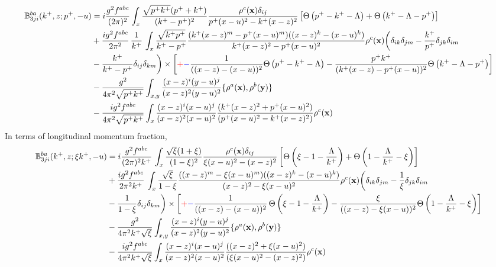 \documentclass[10pt]{article}
\def\mf#1{\mathbb{#1}}
\def\v#1{\mathbf{#1}}
\numberwithin{equation}{section}
\begin{document}
\begin{align}
   \mf{B}^{ba}_{3ji}(k^+, z;p^+, -u) & = i \frac{g^2 f^{abc}}{(2\pi)^{2}} \int_{x} %
   \frac{\sqrt{p^{+}k^{+}}(p^{+}+k^{+})} {(k^{+}-p^{+})^2} \frac{\rho^c(\v{x}) \delta_{ij}}{p^{+}(x-u)^{2} - k^{+}(x-z)^{2} }\left[\Theta\left(p^{+} - k^{+} - \Lambda \right)+\Theta\left(k^{+}-\Lambda-p^{+}\right)\right]  \notag \\ & + \frac{ig^2 f^{abc}} {2\pi^{2} } \,\frac{1}{k^{+}}\, 
   \int_{x}  
   \frac{\sqrt{k^{+}p^{+}}}{k^{+}-p^{+}} 
   \frac{(k^{+}(x-z)^{m} - p^{+} (x-u)^m)((x-z)^{k} -  (x-u)^{k})} {k^{+}(x-z)^{2} - p^{+} (x-u)^2}
   \rho^c(\v{x}) \bigg( 
  \delta_{ik} \delta_{jm}
  - \frac{k^{+}}{p^{+}}\delta_{jk} \delta_{im}
 \notag \\ &  - \frac{k^{+}}{k^{+}-p^{+}}\delta_{ij} \delta_{km}
   \bigg)\times\left[\textcolor{red}{+}\textcolor{blue}{-}\frac{1}{((x-z) -  (x-u))^2}\Theta\left(p^{+} - k^{+} - \Lambda \right)-\frac{p^{+}k^{+}}{(k^{+}(x-z) -  p^{+} (x-u))^2} \Theta\left(k^{+}-\Lambda-p^{+}\right)\right]\notag \\ & -\frac{g^{2}}{4\pi^{2} \sqrt{p^{+}k^{+}}}\int_{x,y}\frac{(x-z)^{i} (y-u)^{j}}{(x-z)^{ 2}(y-u)^{2}}\{\rho^{a}(\v{x}),\rho^{b}(\v{y})\} \notag \\ &  -\frac{ig^{2}f^{abc}}{4\pi^{2} \sqrt{p^{+}k^{+}}} \int_{x}\frac{(x-z)^{i}(x-u)^{j}}{(x-z)^{2}(x-u)^{2}}\frac{(k^{+}(x-z)^{2} +p^{+} (x-u)^{2})}{(p^{+} (x-u)^{2}-k^{+}(x-z)^{2})}\rho^{c}(\v{x})
\end{align}
In terms of longitudinal momentum fraction,
\begin{align}
   \mf{B}^{ba}_{3ji}(k^+, z;\xi k^+, -u) & = i \frac{g^2 f^{abc}}{(2\pi)^{2} k^{+}}\,\int_{x}
   \frac{\sqrt{\xi} (1+\xi) } {(1-\xi)^2} \frac{\rho^c(\v{x}) \delta_{ij}}{\xi (x-u)^{2} - (x-z)^{2} }\left[\Theta\left(\xi - 1 - \frac{\Lambda}{k^{+}}\right)+\Theta\left(1-\frac{\Lambda}{k^{+}}-\xi\right)\right]  \notag \\ & + \frac{ig^2 f^{abc}} {2\pi^{2} k^{+}}\,  
   \int_{x}  
   \frac{\sqrt{\xi}}{1-\xi} 
   \frac{((x-z)^{m} - \xi (x-u)^m)((x-z)^{k} -  (x-u)^{k})} {(x-z)^{2} - \xi (x-u)^2}
   \rho^c(\v{x}) \bigg( 
  \delta_{ik} \delta_{jm}
  - \frac{1}{\xi}\delta_{jk} \delta_{im}
 \notag \\ &  - \frac{1}{1-\xi}\delta_{ij} \delta_{km}
   \bigg)\times  \left[\textcolor{red}{+}\textcolor{blue}{-}\frac{1}{((x-z) -  (x-u))^2}\,\Theta\left(\xi - 1 - \frac{\Lambda}{k^{+}}\right)-\frac{\xi}{((x-z) -  \xi (x-u))^2} \Theta\left(1-\frac{\Lambda}{k^{+}}-\xi\right)\right]\notag \\ & -\frac{g^{2}}{4\pi^{2} k^{+}\sqrt{\xi}}\int_{x,y}\frac{(x-z)^{i} (y-u)^{j}}{(x-z)^{ 2}(y-u)^{2}}\{\rho^{a}(\v{x}),\rho^{b}(\v{y})\} \notag \\ &  -\frac{ig^{2}f^{abc}}{4\pi^{2} k^{+}\sqrt{\xi}} \int_{x}\frac{(x-z)^{i}(x-u)^{j}}{(x-z)^{2}(x-u)^{2}}\frac{((x-z)^{2} +\xi (x-u)^{2})}{(\xi (x-u)^{2}-(x-z)^{2})}\rho^{c}(\v{x})
\end{align}
\end{document}
